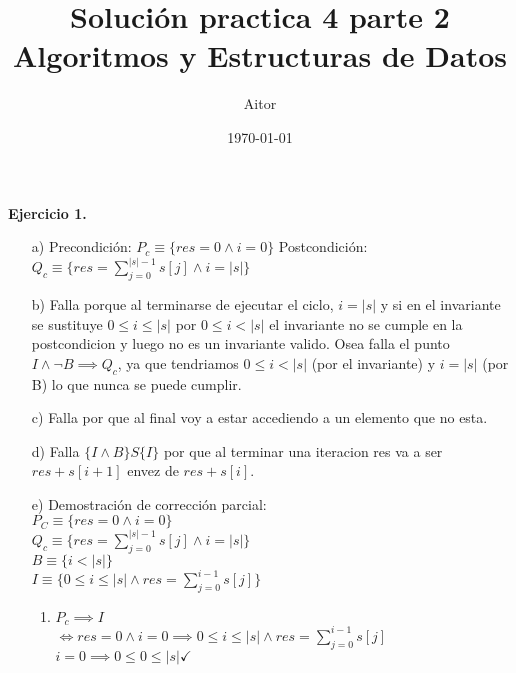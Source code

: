 \documentclass{article}
\title{Soluci\'on practica 4 parte 2 Algoritmos y Estructuras de Datos}
\author{Aitor}
\date{\today}
\begin{document}
\maketitle

\textbf{Ejercicio 1.}
\begin{itemize}
    \item [a)] Precondici\'on: $P_c \equiv \{res = 0 \land i = 0\}$
    Postcondici\'on: $Q_c \equiv \{res = \sum_{j=0}^{|s|-1} s[j] \land i = |s|\}$
    \item [b)] Falla porque al terminarse de ejecutar el ciclo, $i = |s|$ y si en el invariante se sustituye $0 \leq i \leq |s|$ por $0 \leq i < |s|$ el invariante no se cumple en la postcondicion y luego no es un invariante valido. Osea falla el punto $I \land \lnot B \implies Q_c$, ya que tendriamos $0 \leq i < |s|$ (por el invariante) y $i = |s|$ (por B) lo que nunca se puede cumplir.
    \item [c)] Falla por que al final voy a estar accediendo a un elemento que no esta.
    \item [d)] Falla $\{I \land B\}S\{I\}$ por que al terminar una iteracion res va a ser $res + s[i+1]$ envez de $res + s[i]$. 
    
    \item [e)] Demostraci\'on de correcci\'on parcial:\\
    $P_C \equiv \{res = 0 \land i = 0\}$\\
    $Q_c \equiv \{res = \sum_{j=0}^{|s|-1} s[j] \land i = |s|\}$\\
    $B \equiv \{i < |s|\}$\\
    $I \equiv \{0 \leq i \leq |s| \land res = \sum_{j=0}^{i-1} s[j]\}$

    \begin{enumerate}
        \item $P_c \implies I$\\ 
        $\iff res = 0 \land i = 0 \implies 0 \leq i \leq |s| \land res = \sum_{j=0}^{i-1} s[j]$
        $i = 0 \implies 0 \leq 0 \leq |s| \checkmark$


\end{enumerate}
\end{itemize}
\end{document}
